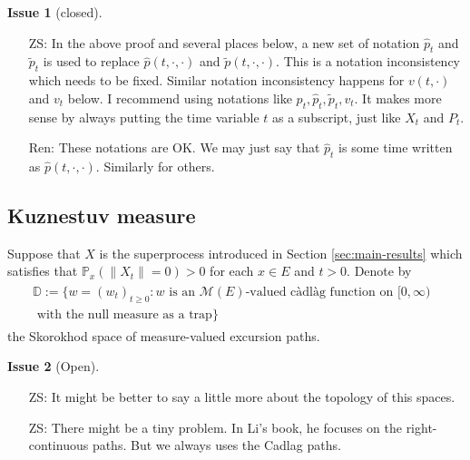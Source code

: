 \documentclass[12pt,a4paper]{amsart}
\numberwithin{equation}{section}
\theoremstyle{plain}
\theoremstyle{definition}
\newtheorem{iss}{Issue}
\begin{document}
\begin{iss}[closed]~
\label{iss:notation_for_pt}
  \begin{itemize}
  \item[ZS:]
    In the above proof and several places below, a new set of notation $\widehat p_t$ and $\widetilde p_t$ is used to replace $\widehat p(t,\cdot,\cdot)$ and $\widetilde p(t,\cdot, \cdot)$. This is a notation inconsistency which needs to be fixed. Similar notation inconsistency happens for $v(t,\cdot)$ and $v_t$ below. I recommend using notations like $p_t, \widehat p_t,\widetilde p_t, v_t$. It makes more sense by always putting the time variable $t$ as a subscript, just like $X_t$ and $P_t$.
    
   \item[Ren:] 
These notations are OK. We may just say that $\widehat p_t$ is some time written as $\widehat p(t,\cdot,\cdot)$. Similarly for others.
  \end{itemize}
\end{iss}

\subsection{Kuznestuv measure}
Suppose that $X$ is the superprocess introduced in Section \ref{sec:main-results} which satisfies that $\mathbb P_{x}(\|X_t\| = 0)>0$ for each $x\in E$ and $t>0$. Denote by
\begin{align} 
\begin{multlined} \mathbb D:=\{ w= (w_t)_{t\geq 0}: w \text{ is an $\mathcal M(E)$-valued c\`{a}dl\`{a}g function on $[0,\infty)$ }
	\\ \text{ with the null measure as a trap} \} \end{multlined}
\end{align}
the Skorokhod space of measure-valued excursion paths.
\begin{iss}[Open]~
  \begin{itemize}
  \item[ZS:]
It might be better to say a little more about the topology of this spaces.
\item[ZS:]
There might be  a tiny problem. In Li's book, he focuses on the right-continuous paths. 
But we always uses the Cadlag paths. 
  \end{itemize}
\end{iss}
\end{document}

